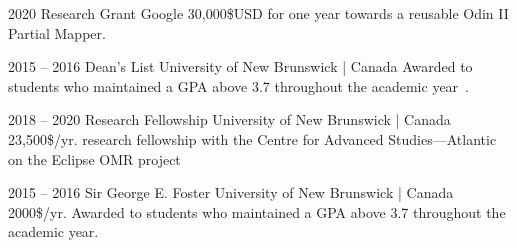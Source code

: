 \documentclass{developercv} %
\begin{document}

\begin{entrylist}

	\entry
	{2020}
	{Research Grant}
	{Google}
	{30,000\$USD for one year towards a reusable Odin II Partial Mapper.}

	\entry
	{2015 -- 2016}
	{Dean's List}
	{University of New Brunswick | Canada}
	{Awarded to students who maintained a GPA above 3.7 throughout the academic year~\cite{google}.}

\end{entrylist}


\begin{entrylist}

	\entry
	{2018 -- 2020}
	{Research Fellowship}
	{University of New Brunswick | Canada}
	{23,500\$/yr. research fellowship  with the Centre for Advanced Studies---Atlantic on the Eclipse OMR project}

	\entry
	{2015 -- 2016}
	{Sir George E. Foster}
	{University of New Brunswick | Canada}
	{2000\$/yr. Awarded to students who maintained a GPA above 3.7 throughout the academic year.}

\end{entrylist}

\end{document}
